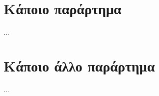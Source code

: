 \documentclass[report.tex]{subfiles}
\begin{document}
\begin{myappendices}

\clearpage
\setcounter{figure}{0}
\section{Κάποιο παράρτημα}

...

\clearpage
\setcounter{figure}{0}
\section{Κάποιο άλλο παράρτημα}

...

\end{myappendices}





\end{document}

